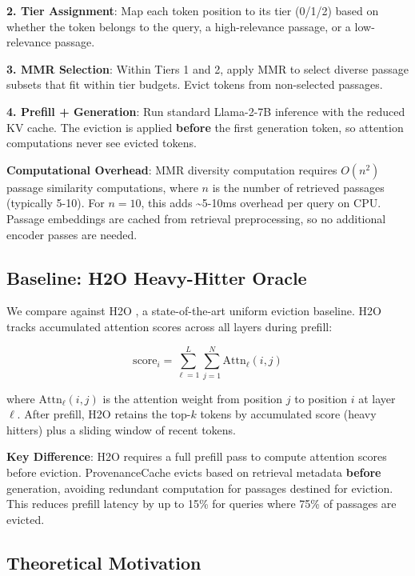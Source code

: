 \textbf{2. Tier Assignment}: Map each token position to its tier (0/1/2) based on whether the token belongs to the query, a high-relevance passage, or a low-relevance passage.

\textbf{3. MMR Selection}: Within Tiers 1 and 2, apply MMR to select diverse passage subsets that fit within tier budgets. Evict tokens from non-selected passages.

\textbf{4. Prefill + Generation}: Run standard Llama-2-7B inference with the reduced KV cache. The eviction is applied \textbf{before} the first generation token, so attention computations never see evicted tokens.

\textbf{Computational Overhead}: MMR diversity computation requires $O(n^2)$ passage similarity computations, where $n$ is the number of retrieved passages (typically 5-10). For $n=10$, this adds \textasciitilde5-10ms overhead per query on CPU. Passage embeddings are cached from retrieval preprocessing, so no additional encoder passes are needed.

\subsection{Baseline: H2O Heavy-Hitter Oracle}

We compare against H2O \cite{zhang2023h2o}, a state-of-the-art uniform eviction baseline. H2O tracks accumulated attention scores across all layers during prefill:

\begin{equation}
\text{score}_i = \sum_{\ell=1}^{L} \sum_{j=1}^{N} \text{Attn}_\ell(i, j)
\end{equation}

where $\text{Attn}_\ell(i, j)$ is the attention weight from position $j$ to position $i$ at layer $\ell$. After prefill, H2O retains the top-$k$ tokens by accumulated score (heavy hitters) plus a sliding window of recent tokens.

\textbf{Key Difference}: H2O requires a full prefill pass to compute attention scores before eviction. ProvenanceCache evicts based on retrieval metadata \textbf{before} generation, avoiding redundant computation for passages destined for eviction. This reduces prefill latency by up to 15\% for queries where 75\% of passages are evicted.

\subsection{Theoretical Motivation}

